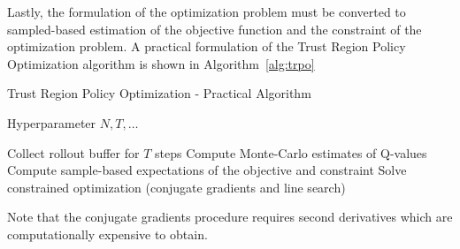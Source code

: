 Lastly, the formulation of the optimization problem must be converted to sampled-based estimation of the
objective function and the constraint of the optimization problem.
A practical formulation of the Trust Region Policy Optimization algorithm is shown in Algorithm~\ref{alg:trpo}
\begin{algorithm}
\caption{Trust Region Policy Optimization - Practical Algorithm}
    \begin{algorithmic}
        \Require  Hyperparameter $N, T, \dots$

            \State Collect rollout buffer for $T$ steps
            \State Compute Monte-Carlo estimates of Q-values
        \EndFor
        \State Compute sample-based expectations of the objective and constraint
        \State Solve constrained optimization (conjugate gradients and line search)
        \EndWhile
    \end{algorithmic}
    \label{alg:trpo}
\end{algorithm}
Note that the conjugate gradients procedure requires second derivatives which are computationally expensive to obtain.

